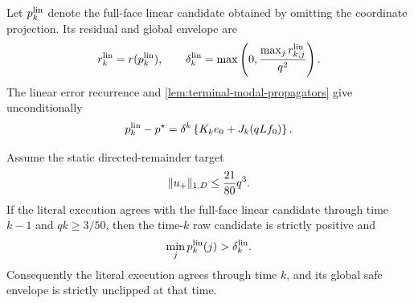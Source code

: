 Let $p_k^{\rm lin}$ denote the full-face linear candidate obtained by omitting
the coordinate projection.  Its residual and global envelope are
\begin{equation}
 r_k^{\rm lin}=r(p_k^{\rm lin}),\qquad
 \delta_k^{\rm lin}=
 \max\left(0,\frac{\max_jr_{k,j}^{\rm lin}}{q^2}\right).
 \label{eq:terminal-modal-linear-residual-envelope}
\end{equation}
The linear error recurrence and \cref{lem:terminal-modal-propagators} give
unconditionally
\begin{equation}
 p_k^{\rm lin}-p^\star
 =\delta^k\left\{K_ke_0+J_k(qLf_0)\right\}.
 \label{eq:terminal-modal-position-candidate-kernel}
\end{equation}

\begin{lemma}
\label{lem:terminal-modal-late-position-envelope}
Assume the static directed-remainder target
\begin{equation}
 \lVert u_+\rVert_{1,D}\le\frac{21}{80}q^3.
 \label{eq:terminal-modal-static-target-assumed}
\end{equation}
If the literal execution agrees with the full-face linear candidate through
time $k-1$ and $qk\ge3/50$, then the time-$k$ raw candidate is strictly
positive and
\begin{equation}
 \min_jp_k^{\rm lin}(j)>\delta_k^{\rm lin}.
 \label{eq:terminal-modal-late-envelope-dominance}
\end{equation}
Consequently the literal execution agrees through time $k$, and its global
safe envelope is strictly unclipped at that time.
\end{lemma}


